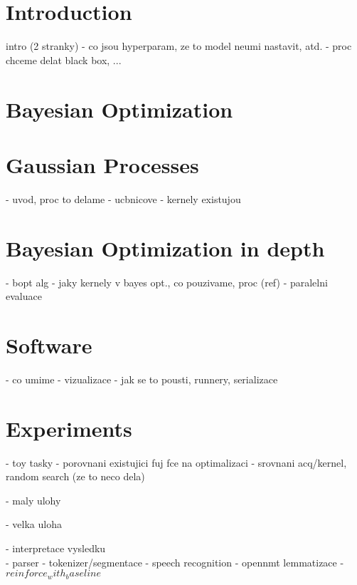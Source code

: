 \chapter{Introduction}
\label{chapter:introduction}

intro (2 stranky)
  - co jsou hyperparam, ze to model neumi nastavit, atd.
  - proc chceme delat black box, ...
\\




\chapter{Bayesian Optimization}
\label{chapter:bo}




\chapter{Gaussian Processes}
\label{chapter:gp}

- uvod, proc to delame
- ucbnicove
- kernely existujou
\\




\chapter{Bayesian Optimization in depth}
\label{chapter:bo-indepth}

- bopt alg
- jaky kernely v bayes opt., co pouzivame, proc (ref)
- paralelni evaluace
\\




\chapter{Software}
\label{chapter:software}

- co umime
- vizualizace
- jak se to pousti, runnery, serializace
\\



\chapter{Experiments}
\label{chapter:experiments}

- toy tasky
  - porovnani existujici fuj fce na optimalizaci
  - srovnani acq/kernel, random search (ze to neco dela)

- maly ulohy

- velka uloha

- interpretace vysledku
\\





- parser
- tokenizer/segmentace
- speech recognition
- opennmt lemmatizace
- $reinforce_with_baseline$


